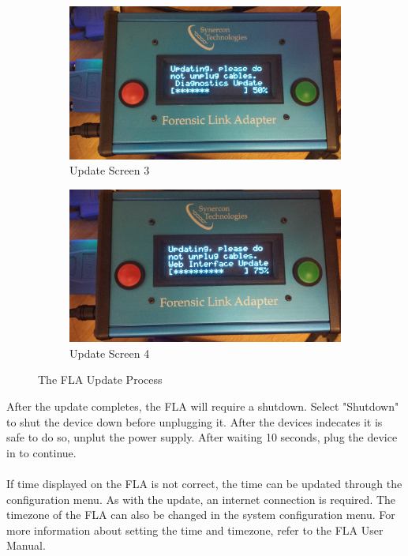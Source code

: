 \documentclass[11pt, oneside]{book}
\begin{document}
\begin{figure}[tbph]
        \begin{subfigure}[b]{0.475\textwidth}   
            \centering 
            \includegraphics[width=\textwidth]{../media/fla_screens/update_diag}
            \caption[hello]%
            {{\small Update Screen 3}}    
            \label{fig:fla_update_3}
        \end{subfigure}
        \quad
        \begin{subfigure}[b]{0.475\textwidth}   
            \centering 
            \includegraphics[width=\textwidth]{../media/fla_screens/update_web}
            \caption[hello3]%
            {{\small Update Screen 4}}    
            \label{fig:fla_update_4}
        \end{subfigure}
        \caption[Update]
        {\small The FLA Update Process} 
        \label{fig:fla_update}
    \end{figure}
After the update completes, the FLA will require a shutdown. Select "Shutdown" to shut the device down before unplugging it. After the devices indecates it is safe to do so, unplut the power supply. After waiting 10 seconds, plug the device in to continue.
\paragraph{  }
If time displayed on the FLA is not correct, the time can be updated through the configuration menu. As with the update, an internet connection is required. The timezone of the FLA can also be changed in the system configuration menu. For more information about setting the time and timezone, refer to the FLA User Manual.
\end{document}
